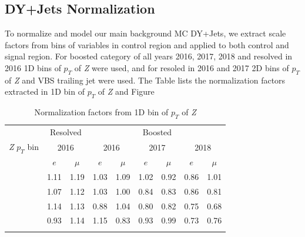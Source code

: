 \subsection{
  DY+Jets Normalization
}

To normalize and model our main background \gls{MC} DY+Jets,
we extract scale factors from bins of variables
in control region and applied to both control and signal region.
For boosted category of all years 2016, 2017, 2018
and resolved in 2016 1D bins of \( p_T \) of \textit{Z} were used, and
for resoled in 2016 and 2017 2D bins of \( p_T \) of \textit{Z} and VBS trailing
jet were used. The Table lists the normalization
factors extracted in 1D bin of \( p_T \) of \textit{Z} and
Figure

\begin{table}
  \caption{Normalization factors from 1D bin of \( p_T \) of \textit{Z}}
  \centering
  \begin{tabular}{lcccccccc}
    \toprule
                           & \multicolumn{2}{c}{Resolved} & \multicolumn{6}{c}{Boosted}                                                                                                   \\
    \cmidrule(lr){2-9}
    \textit{Z} \(p_T\) bin & \multicolumn{2}{c}{2016}     & \multicolumn{2}{c}{2016}    & \multicolumn{2}{c}{2017} & \multicolumn{2}{c}{2018}                                             \\
    \midrule
                           & \( e \)                      & \( \mu \)                   & \( e \)                  & \( \mu \)                & \( e \) & \( \mu \) & \( e \) & \( \mu \) \\
    \cmidrule(lr){2-9}\relax
    [0, 80]                & 1.11                         & 1.19                        & 1.03                     & 1.09                     & 1.02    & 0.92      & 0.86    & 1.01      \\\relax
    [80, 160]              & 1.07                         & 1.12                        & 1.03                     & 1.00                     & 0.84    & 0.83      & 0.86    & 0.81      \\\relax
    [160, 240]             & 1.14                         & 1.13                        & 0.88                     & 1.04                     & 0.80    & 0.82      & 0.75    & 0.68      \\\relax
    [240, 320]             & 0.93                         & 1.14                        & 1.15                     & 0.83                     & 0.93    & 0.99      & 0.73    & 0.76      \\\relax

\end{tabular}
\end{table}
